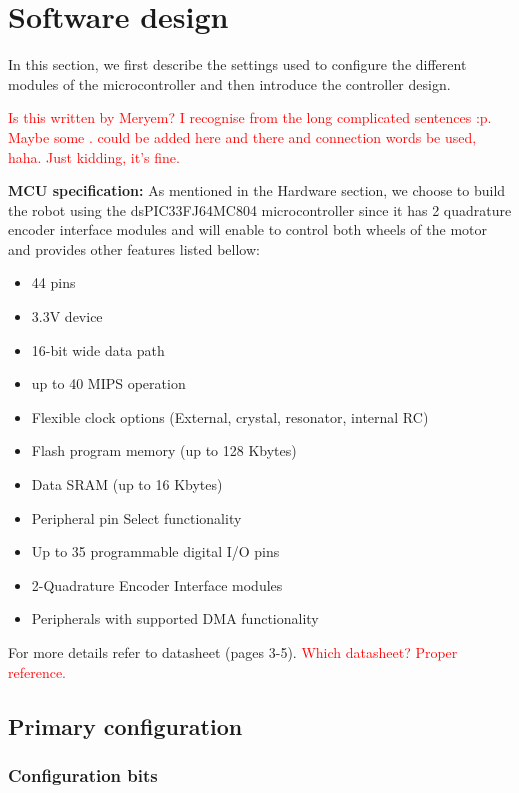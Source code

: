 \section{Software design} \label{chap:software}
In this section, we first describe the settings used to configure the different modules of the microcontroller and then introduce the controller design.

\textcolor{red}{Is this written by Meryem? I recognise from the long complicated sentences :p. Maybe some . could be added here and there and connection words be used, haha. Just kidding, it's fine.}

\vskip 0.2in
\noindent
\textbf{MCU specification:}
\vskip 0.1in
\noindent
As mentioned in the Hardware section, we choose to build the robot using the dsPIC33FJ64MC804 microcontroller since it has 2 quadrature encoder interface modules and will enable to control both wheels of the motor and provides other features listed bellow:
\begin{itemize}
    \item 44 pins
    \item 3.3V device
    \item 16-bit wide data path
    \item up to 40 MIPS operation
    \item Flexible clock options (External, crystal, resonator, internal RC)
    \item Flash program memory (up to 128 Kbytes)
    \item Data SRAM (up to 16 Kbytes)
    \item Peripheral pin Select functionality
    \item Up to 35 programmable digital I/O pins
    \item 2-Quadrature Encoder Interface modules
    \item Peripherals with supported DMA functionality
\end{itemize}
For more details refer to datasheet (pages 3-5).
\textcolor{red}{Which datasheet? Proper reference.}

\subsection{Primary configuration}

\subsubsection*{Configuration bits}

